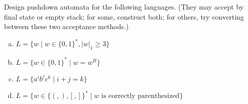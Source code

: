 \documentclass[a4paper,12pt]{amsart}
\begin{document}
\medskip\begin{problem}

    Design pushdown automata for the following languages. (They may accept by final state or empty stack; for some, construct both; for others, try converting between these two acceptance methods.)

    \medskip

    \begin{enumerate}[(a)]\setlength\itemsep{9pt}
        \item $L=\{w\mid w\in\{0,1\}^*,|w|_1\geq 3\}$        
        \item $L=\{w\in \{0,1\}^*\mid w=w^R\}$        
        \item $L=\{a^ib^jc^k\mid i+j=k\}$        
        \item $L=\{w\in\{(,),[,]\}^*\mid w\text{ is correctly parenthesized}\}$
    \end{enumerate}

\end{problem}
\end{document}
